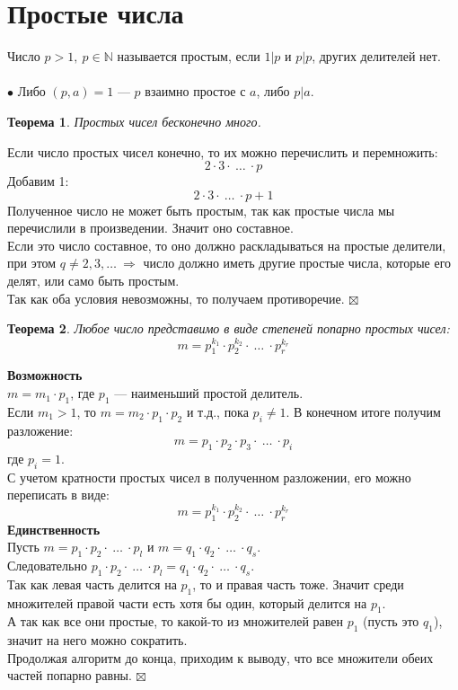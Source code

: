 \documentclass[a4paper, 12pt]{article}
\newtheorem*{theorem}{Теорема}
\newenvironment{Proof}
{\par\noindent{$\blacklozenge$}}
{\hfill$\scriptstyle\boxtimes$}
\newcommand{\N}{\mathbb{N}}
\begin{document}
    \section{Простые числа}
    Число $p>1, \ p \in \N$ называется простым, если $1|p$ и $p|p$, других делителей нет.\\\\
    $\bullet$ Либо $(p,a)=1$ --- $p$ взаимно простое с $a$, либо $p|a$.
    \begin{theorem}
        Простых чисел бесконечно много.
    \end{theorem}
    \begin{Proof}
    Если число простых чисел конечно, то их можно перечислить и перемножить:
    $$2\cdot3\cdot \ \dots \ \cdot p$$
    Добавим 1:
    $$2\cdot3\cdot \ \dots \ \cdot p +1$$
    Полученное число не может быть простым, так как простые числа мы перечислили в произведении. Значит оно составное.\\
    Если это число составное, то оно должно раскладываться на простые делители, при этом $q \neq 2,3,\dots \ \Rightarrow$ число должно иметь другие простые числа, которые его делят, или само быть простым.\\
    Так как оба условия невозможны, то получаем противоречие.
    \end{Proof}\\
    \begin{theorem}
        Любое число представимо в виде степеней попарно простых чисел:
        $$m=p_1^{k_1}\cdot p_2^{k_2}\cdot \ \dots \ \cdot p_r^{k_r}$$
    \end{theorem}
    \begin{Proof}
    \textbf{Возможность}\\
    $m=m_1 \cdot p_1$, где $p_1$ --- наименьший простой делитель.\\
    Если $m_1>1$, то $m=m_2 \cdot p_1 \cdot p_2$ и т.д., пока $p_i \neq 1$.
    В конечном итоге получим разложение:
    $$m=p_1\cdot p_2\cdot p_3\cdot \ \dots \ \cdot p_i$$
    где $p_i = 1$.\\
    С учетом кратности простых чисел в полученном разложении, его можно переписать в виде:
    $$m=p_1^{k_1}\cdot p_2^{k_2}\cdot \ \dots \ \cdot p_r^{k_r}$$
    \textbf{Единственность}\\
    Пусть $m=p_1\cdot p_2 \cdot \ \dots \ \cdot p_l$ и $m=q_1 \cdot q_2 \cdot \ \dots \ \cdot q_s$.\\
    Следовательно $p_1\cdot p_2 \cdot \ \dots \ \cdot p_l=q_1 \cdot q_2 \cdot \ \dots \ \cdot q_s$.\\
    Так как левая часть делится на $p_1$, то и правая часть тоже. Значит среди множителей правой части есть хотя бы один, который делится на $p_1$.\\
    А так как все они простые, то какой-то из множителей равен $p_1$ (пусть это $q_1$), значит на него можно сократить.\\
    Продолжая алгоритм до конца, приходим к выводу, что все множители обеих частей попарно равны.
    \end{Proof}
\end{document}

